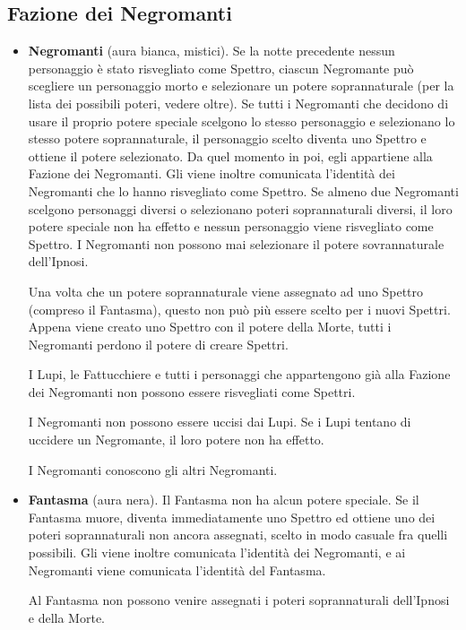 \documentclass[a4paper,10pt]{article}
\begin{document}
\subsection*{Fazione dei Negromanti}
\label{negromanti}
\begin{itemize}

 \item {\bf Negromanti} (aura bianca, mistici). Se la notte precedente nessun personaggio è stato risvegliato come Spettro, ciascun Negromante può scegliere un personaggio morto e selezionare un potere soprannaturale (per la lista dei possibili poteri, vedere oltre). Se tutti i Negromanti che decidono di usare il proprio potere speciale scelgono lo stesso personaggio e selezionano lo stesso potere soprannaturale, il personaggio scelto diventa uno Spettro e ottiene il potere selezionato. Da quel momento in poi, egli appartiene alla Fazione dei Negromanti. Gli viene inoltre comunicata l'identità dei Negromanti che lo hanno risvegliato come Spettro.
 Se almeno due Negromanti scelgono personaggi diversi o selezionano poteri soprannaturali diversi, il loro potere speciale non ha effetto e nessun personaggio viene risvegliato come Spettro.
I Negromanti non possono mai selezionare il potere sovrannaturale dell'Ipnosi.
 
 Una volta che un potere soprannaturale viene assegnato ad uno Spettro (compreso il Fantasma), questo non può più essere scelto per i nuovi Spettri. Appena viene creato uno Spettro con il potere della Morte, tutti i Negromanti perdono il potere di creare Spettri.
 
 I Lupi, le Fattucchiere e tutti i personaggi che appartengono già alla Fazione dei Negromanti non possono essere risvegliati come Spettri.

 I Negromanti non possono essere uccisi dai Lupi. Se i Lupi tentano di uccidere un Negromante, il loro potere non ha effetto.

 I Negromanti conoscono gli altri Negromanti.
 
 \item {\bf Fantasma} (aura nera). Il Fantasma non ha alcun potere speciale. Se il Fantasma muore, diventa immediatamente uno Spettro ed ottiene uno dei poteri soprannaturali non ancora assegnati, scelto in modo casuale fra quelli possibili. Gli viene inoltre comunicata l'identità dei Negromanti, e ai Negromanti viene comunicata l'identità del Fantasma.
 
 Al Fantasma non possono venire assegnati i poteri soprannaturali dell'Ipnosi e della Morte.
 

\end{itemize}
\end{document}

